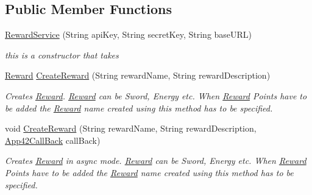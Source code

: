 \subsection*{Public Member Functions}
\begin{DoxyCompactItemize}
\item 
\hyperlink{classcom_1_1shephertz_1_1app42_1_1paas_1_1sdk_1_1csharp_1_1reward_1_1_reward_service_addea1428413f2ef77c6952166d22c37d}{Reward\+Service} (String api\+Key, String secret\+Key, String base\+U\+R\+L)
\begin{DoxyCompactList}\small\item\em this is a constructor that takes \end{DoxyCompactList}\item 
\hyperlink{classcom_1_1shephertz_1_1app42_1_1paas_1_1sdk_1_1csharp_1_1reward_1_1_reward}{Reward} \hyperlink{classcom_1_1shephertz_1_1app42_1_1paas_1_1sdk_1_1csharp_1_1reward_1_1_reward_service_affaa3378981a478d880f99559a431a5a}{Create\+Reward} (String reward\+Name, String reward\+Description)
\begin{DoxyCompactList}\small\item\em Creates \hyperlink{classcom_1_1shephertz_1_1app42_1_1paas_1_1sdk_1_1csharp_1_1reward_1_1_reward}{Reward}. \hyperlink{classcom_1_1shephertz_1_1app42_1_1paas_1_1sdk_1_1csharp_1_1reward_1_1_reward}{Reward} can be Sword, Energy etc. When \hyperlink{classcom_1_1shephertz_1_1app42_1_1paas_1_1sdk_1_1csharp_1_1reward_1_1_reward}{Reward} Points have to be added the \hyperlink{classcom_1_1shephertz_1_1app42_1_1paas_1_1sdk_1_1csharp_1_1reward_1_1_reward}{Reward} name created using this method has to be specified. \end{DoxyCompactList}\item 
void \hyperlink{classcom_1_1shephertz_1_1app42_1_1paas_1_1sdk_1_1csharp_1_1reward_1_1_reward_service_ac47ad8fb0b1f5c3217396e96e90ec95c}{Create\+Reward} (String reward\+Name, String reward\+Description, \hyperlink{interfacecom_1_1shephertz_1_1app42_1_1paas_1_1sdk_1_1csharp_1_1_app42_call_back}{App42\+Call\+Back} call\+Back)
\begin{DoxyCompactList}\small\item\em Creates \hyperlink{classcom_1_1shephertz_1_1app42_1_1paas_1_1sdk_1_1csharp_1_1reward_1_1_reward}{Reward} in async mode. \hyperlink{classcom_1_1shephertz_1_1app42_1_1paas_1_1sdk_1_1csharp_1_1reward_1_1_reward}{Reward} can be Sword, Energy etc. When \hyperlink{classcom_1_1shephertz_1_1app42_1_1paas_1_1sdk_1_1csharp_1_1reward_1_1_reward}{Reward} Points have to be added the \hyperlink{classcom_1_1shephertz_1_1app42_1_1paas_1_1sdk_1_1csharp_1_1reward_1_1_reward}{Reward} name created using this method has to be specified. \end{DoxyCompactList}\item 

\end{DoxyCompactItemize}
